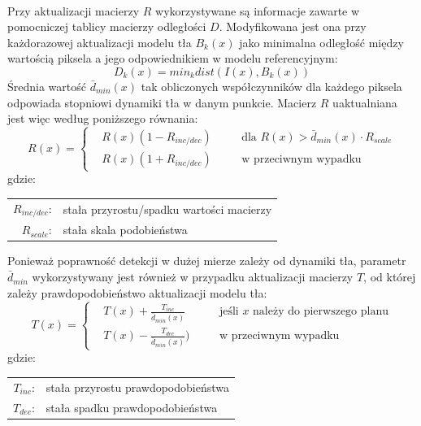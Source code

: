 \paragraph{}
Przy aktualizacji macierzy $R$ wykorzystywane są informacje zawarte w pomocniczej tablicy macierzy odległości $D$. Modyfikowana jest ona przy każdorazowej aktualizacji modelu tła $B_{k}(x)$ jako minimalna odległość między wartością piksela a jego odpowiednikiem w modelu referencyjnym:
\begin{equation}
D_{k}(x)=min_{k}dist(I(x),B_{k}(x))
\end{equation}
Średnia wartość $\bar{d}_{min}(x)$ tak obliczonych współczynników dla każdego piksela odpowiada stopniowi dynamiki tła w danym punkcie. Macierz $R$ uaktualniana jest więc według poniższego równania:
\begin{equation}
R(x) = \left\{
\begin{split}
&R(x)(1-R_{inc/dec}) & \quad &\text{dla $R(x)>\bar{d}_{min}(x)\cdot R_{scale}$} \\
&R(x)(1+R_{inc/dec}) & \quad &\text{w przeciwnym wypadku}
\end{split}
\right.
\end{equation}
gdzie:\\ 
\hspace*{3em}
\begin{tabular}{r l}
$R_{inc/dec}$: &  stała przyrostu/spadku wartości macierzy\\
$R_{scale}$: & stała skala podobieństwa
\end{tabular}
Ponieważ poprawność detekcji w dużej mierze zależy od dynamiki tła, parametr $\bar{d}_{min}$ wykorzystywany jest również w przypadku aktualizacji macierzy $T$, od której zależy prawdopodobieństwo aktualizacji modelu tła:
\begin{equation}
T(x) = \left\{
\begin{split}
&T(x)+\frac{T_{inc}}{\bar{d}_{min}(x)} & \quad &\text{jeśli $x$ należy do pierwszego planu} \\
&T(x)-\frac{T_{dec}}{\bar{d}_{min}(x)}) & \quad &\text{w przeciwnym wypadku}
\end{split}
\right.
\end{equation}
gdzie:\\ 
\hspace*{3em}
\begin{tabular}{r l}
$T_{inc}$: &  stała przyrostu prawdopodobieństwa\\
$T_{dec}$: & stała spadku prawdopodobieństwa
\end{tabular} \\

